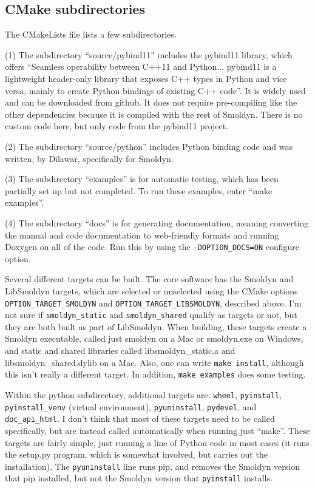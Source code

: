 \documentclass {scrbook}
\newcommand {\ttt} {\texttt}
\begin{document}
\subsection{CMake subdirectories}

The CMakeLists file lists a few subdirectories.

(1) The subdirectory ``source/pybind11'' includes the pybind11 library, which offers ``Seamless operability between C++11 and Python... pybind11 is a lightweight header-only library that exposes C++ types in Python and vice versa, mainly to create Python bindings of existing C++ code''. It is widely used and can be downloaded from github. It does not require pre-compiling like the other dependencies because it is compiled with the rest of Smoldyn. There is no custom code here, but only code from the pybind11 project.

(2) The subdirectory ``source/python'' includes Python binding code and was written, by Dilawar, specifically for Smoldyn.

(3) The subdirectory ``examples'' is for automatic testing, which has been partially set up but not completed. To run these examples, enter ``make examples''.

(4) The subdirectory ``docs'' is for generating documentation, meaning converting the manual and code documentation to web-friendly formats and running Doxygen on all of the code. Run this by using the \ttt{-DOPTION\_DOCS=ON} configure option.

Several different targets can be built. The core software has the Smoldyn and LibSmoldyn targets, which are selected or unselected using the CMake options \ttt{OPTION\_TARGET\_SMOLDYN} and \ttt{OPTION\_TARGET\_LIBSMOLDYN}, described above. I'm not sure if \ttt{smoldyn\_static} and \ttt{smoldyn\_shared} qualify as targets or not, but they are both built as part of LibSmoldyn. When building, these targets create a Smoldyn executable, called just smoldyn on a Mac or smoldyn.exe on Windows, and static and shared libraries called libsmoldyn\_static.a and libsmoldyn\_shared.dylib on a Mac. Also, one can write \ttt{make install}, although this isn't really a different target. In addition, \ttt{make examples} does some testing.

Within the python subdirectory, additional targets are: \ttt{wheel}, \ttt{pyinstall}, \ttt{pyinstall\_venv} (virtual environment), \ttt{pyuninstall}, \ttt{pydevel}, and \ttt{doc\_api\_html}. I don't think that most of these targets need to be called specifically, but are instead called automatically when running just ``make''. These targets are fairly simple, just running a line of Python code in most cases (it runs the setup.py program, which is somewhat involved, but carries out the installation). The \ttt{pyuninstall} line runs pip, and removes the Smoldyn version that pip installed, but not the Smoldyn version that \ttt{pyinstall} installs.
\end{document}

